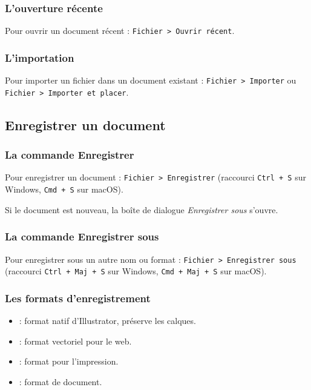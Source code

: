 \subsubsection{L'ouverture récente}

Pour ouvrir un document récent : \texttt{Fichier > Ouvrir récent}.

\subsubsection{L'importation}

Pour importer un fichier dans un document existant : \texttt{Fichier > Importer} ou \texttt{Fichier > Importer et placer}.

\subsection{Enregistrer un document}

\subsubsection{La commande Enregistrer}

Pour enregistrer un document : \texttt{Fichier > Enregistrer} (raccourci \texttt{Ctrl + S} sur Windows, \texttt{Cmd + S} sur macOS).

Si le document est nouveau, la boîte de dialogue \emph{Enregistrer sous} s'ouvre.

\subsubsection{La commande Enregistrer sous}

Pour enregistrer sous un autre nom ou format : \texttt{Fichier > Enregistrer sous} (raccourci \texttt{Ctrl + Maj + S} sur Windows, \texttt{Cmd + Maj + S} sur macOS).

\subsubsection{Les formats d'enregistrement}

\begin{itemize}
    \item {} : format natif d'Illustrator, préserve les calques.
    \item {} : format vectoriel pour le web.
    \item {} : format pour l'impression.
    \item {} : format de document.
\end{itemize}

